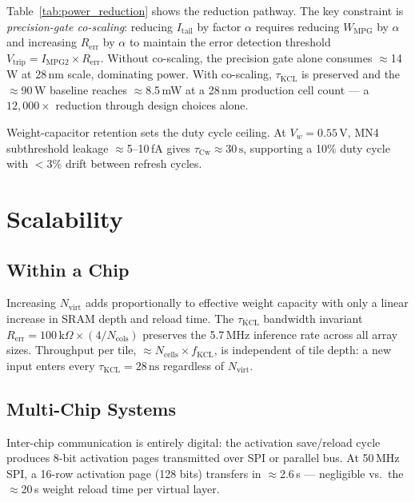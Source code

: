 \documentclass[journal,10pt,twoside]{IEEEtran}
\begin{document}
Table~\ref{tab:power_reduction} shows the reduction pathway.
The key constraint is \emph{precision-gate co-scaling}:
reducing $I_\text{tail}$ by factor $\alpha$ requires reducing $W_\text{MPG}$
by $\alpha$ and increasing $R_\text{err}$ by $\alpha$ to maintain the error
detection threshold $V_\text{trip} = I_\text{MPG2} \times R_\text{err}$.
Without co-scaling, the precision gate alone consumes
$\approx$14\,W at 28\,nm scale, dominating power.
With co-scaling, $\tau_\text{KCL}$ is preserved and the $\approx$90\,W
baseline reaches $\approx$8.5\,mW at a 28\,nm production cell count —
a $12{,}000\times$ reduction through design choices alone.

Weight-capacitor retention sets the duty cycle ceiling.
At $V_w = 0.55\,\text{V}$, MN4 subthreshold leakage $\approx$5--10\,fA
gives $\tau_\text{Cw} \approx 30\,\text{s}$, supporting a 10\% duty cycle
with $<$3\% drift between refresh cycles.

\section{Scalability}
\label{sec:scalability}

\subsection{Within a Chip}

Increasing $N_\text{virt}$ adds proportionally to effective weight capacity
with only a linear increase in SRAM depth and reload time.
The $\tau_\text{KCL}$ bandwidth invariant
$R_\text{err} = 100\,\text{k}\Omega \times (4/N_\text{cols})$
preserves the 5.7\,MHz inference rate across all array sizes.
Throughput per tile, $\approx N_\text{cells} \times f_\text{KCL}$,
is independent of tile depth: a new input enters every
$\tau_\text{KCL} = 28\,\text{ns}$ regardless of $N_\text{virt}$.

\subsection{Multi-Chip Systems}

Inter-chip communication is entirely digital: the activation save/reload
cycle produces 8-bit activation pages transmitted over SPI or parallel bus.
At 50\,MHz SPI, a 16-row activation page (128 bits) transfers in
$\approx$2.6\,\textmu s — negligible vs.\ the $\approx$20\,\textmu s
weight reload time per virtual layer.
\end{document}
